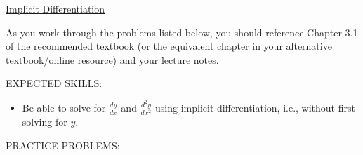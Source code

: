 \documentclass[12pt]{article}
\begin{document}
\begin{center}
\underline{\LARGE{Implicit Differentiation}}
\end{center}

\bigskip

\noindent As you work through the problems listed below, you should reference Chapter 3.1 of the recommended textbook (or the equivalent chapter in your alternative textbook/online resource) and your lecture notes.

\bigskip

\noindent EXPECTED SKILLS:

\begin{itemize}

\item Be able to solve for $\frac{dy}{dx}$ and $\frac{d^2y}{dx^2}$ using implicit differentiation, i.e., without first solving for $y$.

\end{itemize}

\noindent PRACTICE PROBLEMS:

\medskip

\end{document}
